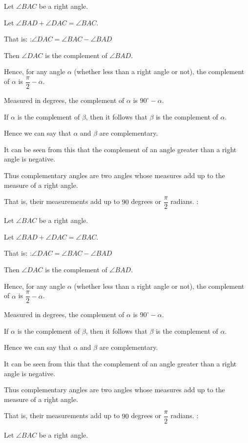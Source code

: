Let $\angle BAC$ be a right angle.

Let $\angle BAD + \angle DAC = \angle BAC$.

That is:
:$\angle DAC = \angle BAC - \angle BAD$


Then $\angle DAC$ is the complement of $\angle BAD$.


Hence, for any angle $\alpha$ (whether less than a right angle or not), the complement of $\alpha$ is $\dfrac \pi 2 - \alpha$.

Measured in degrees, the complement of $\alpha$ is $90^\circ - \alpha$.


If $\alpha$ is the complement of $\beta$, then it follows that $\beta$ is the complement of $\alpha$.

Hence we can say that $\alpha$ and $\beta$ are complementary.


It can be seen from this that the complement of an angle greater than a right angle is negative.


Thus complementary angles are two angles whose measures add up to the measure of a right angle.

That is, their measurements add up to $90$ degrees or $\dfrac \pi 2$ radians.
:

Let $\angle BAC$ be a right angle.

Let $\angle BAD + \angle DAC = \angle BAC$.

That is:
:$\angle DAC = \angle BAC - \angle BAD$


Then $\angle DAC$ is the complement of $\angle BAD$.


Hence, for any angle $\alpha$ (whether less than a right angle or not), the complement of $\alpha$ is $\dfrac \pi 2 - \alpha$.

Measured in degrees, the complement of $\alpha$ is $90^\circ - \alpha$.


If $\alpha$ is the complement of $\beta$, then it follows that $\beta$ is the complement of $\alpha$.

Hence we can say that $\alpha$ and $\beta$ are complementary.


It can be seen from this that the complement of an angle greater than a right angle is negative.


Thus complementary angles are two angles whose measures add up to the measure of a right angle.

That is, their measurements add up to $90$ degrees or $\dfrac \pi 2$ radians.
:

Let $\angle BAC$ be a right angle.

